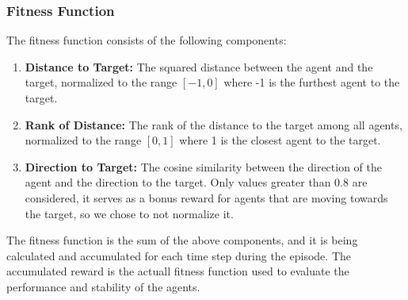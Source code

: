 \documentclass[sigconf]{acmart}
\begin{document}
\subsubsection{Fitness Function}
The fitness function consists of the following components:
\begin{enumerate}
  \item \textbf{Distance to Target:} The squared distance between the agent and the target, normalized to the range $[-1, 0]$ where -1 is the furthest agent to the target.
  \item \textbf{Rank of Distance:} The rank of the distance to the target among all agents, normalized to the range $[0, 1]$ where 1 is the closest agent to the target.
  \item \textbf{Direction to Target:} The cosine similarity between the direction of the agent and the direction to the target. Only values greater than 0.8 are considered, it serves as a bonus reward for agents that are moving towards the target, so we chose to not normalize it.
\end{enumerate}
The fitness function is the sum of the above components, and it is being calculated and accumulated for each time step during the episode.
The accumulated reward is the actuall fitness function used to evaluate the performance and stability of the agents.
\end{document}
